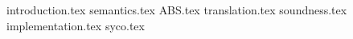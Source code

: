 \documentclass[spanish, a4paper, 12pt] {book}
\begin{document}
{introduction.tex}
{semantics.tex}
{ABS.tex}
{translation.tex}
{soundness.tex}
{implementation.tex}
{syco.tex}
\end{document}
